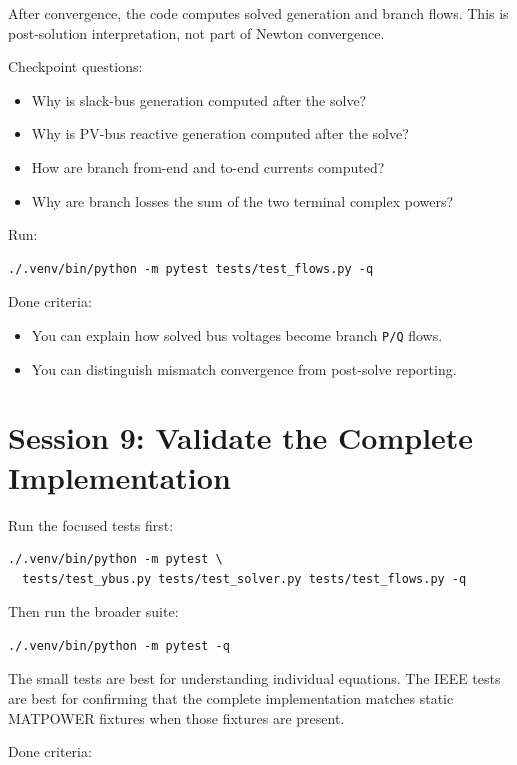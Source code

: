 \documentclass[11pt]{article}
\newcommand{\code}[1]{\texttt{#1}}
\begin{document}
After convergence, the code computes solved generation and branch flows. This is
post-solution interpretation, not part of Newton convergence.

Checkpoint questions:

\begin{itemize}
  \item Why is slack-bus generation computed after the solve?
  \item Why is PV-bus reactive generation computed after the solve?
  \item How are branch from-end and to-end currents computed?
  \item Why are branch losses the sum of the two terminal complex powers?
\end{itemize}

Run:

\begin{verbatim}
./.venv/bin/python -m pytest tests/test_flows.py -q
\end{verbatim}

Done criteria:

\begin{itemize}
  \item You can explain how solved bus voltages become branch \code{P/Q} flows.
  \item You can distinguish mismatch convergence from post-solve reporting.
\end{itemize}

\section{Session 9: Validate the Complete Implementation}

Run the focused tests first:

\begin{verbatim}
./.venv/bin/python -m pytest \
  tests/test_ybus.py tests/test_solver.py tests/test_flows.py -q
\end{verbatim}

Then run the broader suite:

\begin{verbatim}
./.venv/bin/python -m pytest -q
\end{verbatim}

The small tests are best for understanding individual equations. The IEEE tests
are best for confirming that the complete implementation matches static
MATPOWER fixtures when those fixtures are present.

Done criteria:
\end{document}
